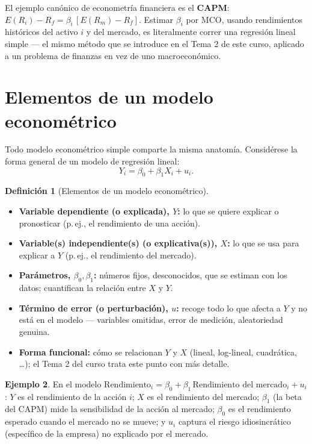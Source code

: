 \documentclass[11pt,a4paper,oneside]{article}
\theoremstyle{definition}
\newtheorem{definition}{Definición}[section]
\newtheorem{example}[definition]{Ejemplo}
\begin{document}
\begin{empresaBox}
El ejemplo canónico de econometría financiera es el \textbf{CAPM}:
$E(R_i) - R_f = \beta_i\,[E(R_m)-R_f]$. Estimar $\beta_i$ por MCO, usando
rendimientos históricos del activo $i$ y del mercado, es literalmente
correr una regresión lineal simple --- el mismo método que se introduce en
el Tema 2 de este curso, aplicado a un problema de finanzas en vez de uno
macroeconómico.
\end{empresaBox}

\section{Elementos de un modelo econométrico}

Todo modelo econométrico simple comparte la misma anatomía. Considérese la
forma general de un modelo de regresión lineal:
\[
Y_i = \beta_0 + \beta_1 X_i + u_i.
\]

\begin{definition}[Elementos de un modelo econométrico]
\begin{itemize}[nosep]
\item \textbf{Variable dependiente (o explicada), $Y$:} lo que se quiere explicar o pronosticar (p.\,ej., el rendimiento de una acción).
\item \textbf{Variable(s) independiente(s) (o explicativa(s)), $X$:} lo que se usa para explicar a $Y$ (p.\,ej., el rendimiento del mercado).
\item \textbf{Parámetros, $\beta_0,\beta_1$:} números fijos, desconocidos, que se estiman con los datos; cuantifican la relación entre $X$ y $Y$.
\item \textbf{Término de error (o perturbación), $u$:} recoge todo lo que afecta a $Y$ y no está en el modelo --- variables omitidas, error de medición, aleatoriedad genuina.
\item \textbf{Forma funcional:} cómo se relacionan $Y$ y $X$ (lineal, log-lineal, cuadrática, \dots); el Tema 2 del curso trata este punto con más detalle.
\end{itemize}
\end{definition}

\begin{example}
En el modelo $\text{Rendimiento}_i = \beta_0 + \beta_1\,\text{Rendimiento del mercado}_i + u_i$:
$Y$ es el rendimiento de la acción $i$; $X$ es el rendimiento del mercado;
$\beta_1$ (la beta del CAPM) mide la sensibilidad de la acción al mercado;
$\beta_0$ es el rendimiento esperado cuando el mercado no se mueve; y $u_i$
captura el riesgo idiosincrático (específico de la empresa) no explicado por
el mercado.
\end{example}
\end{document}
